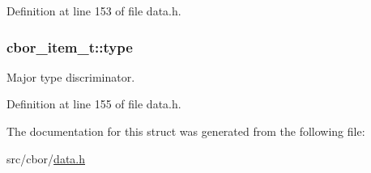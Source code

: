 Definition at line 153 of file data.\-h.

\hypertarget{structcbor__item__t_a6743a75cf89e1b455ddf3198ff98842a}{
\subsubsection[{type}]{ cbor\-\_\-item\-\_\-t\-::type}}\label{structcbor__item__t_a6743a75cf89e1b455ddf3198ff98842a}


Major type discriminator. 



Definition at line 155 of file data.\-h.



The documentation for this struct was generated from the following file\-:\begin{DoxyCompactItemize}
\item 
src/cbor/\hyperlink{data_8h}{data.\-h}\end{DoxyCompactItemize}
